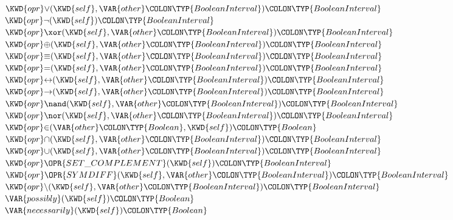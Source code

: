 \begin{Fortress}
\(  \KWD{opr} \mathord{\vee}(\KWD{self}, \VAR{other}\COLON \TYP{BooleanInterval})\COLON \TYP{BooleanInterval}\)\\
\(  \KWD{opr} \mathord{\neg}(\KWD{self})\COLON \TYP{BooleanInterval}\)\\
\(  \KWD{opr} \mathord{\xor}(\KWD{self}, \VAR{other}\COLON \TYP{BooleanInterval})\COLON \TYP{BooleanInterval}\)\\
\(  \KWD{opr} \mathord{\oplus}(\KWD{self}, \VAR{other}\COLON \TYP{BooleanInterval})\COLON \TYP{BooleanInterval}\)\\
\(  \KWD{opr} \mathord{\equiv}(\KWD{self}, \VAR{other}\COLON \TYP{BooleanInterval})\COLON \TYP{BooleanInterval}\)\\
\(  \KWD{opr} \mathord{=}(\KWD{self}, \VAR{other}\COLON \TYP{BooleanInterval})\COLON \TYP{BooleanInterval}\)\\
\(  \KWD{opr} \mathord{\leftrightarrow}(\KWD{self}, \VAR{other}\COLON \TYP{BooleanInterval})\COLON \TYP{BooleanInterval}\)\\
\(  \KWD{opr} \mathord{\rightarrow}(\KWD{self}, \VAR{other}\COLON \TYP{BooleanInterval})\COLON \TYP{BooleanInterval}\)\\
\(  \KWD{opr} \mathord{\nand}(\KWD{self}, \VAR{other}\COLON \TYP{BooleanInterval})\COLON \TYP{BooleanInterval}\)\\
\(  \KWD{opr} \mathord{\nor}(\KWD{self}, \VAR{other}\COLON \TYP{BooleanInterval})\COLON \TYP{BooleanInterval}\)\\
\(  \KWD{opr} \mathord{\in}(\VAR{other}\COLON \TYP{Boolean}, \KWD{self})\COLON \TYP{Boolean}\)\\
\(  \KWD{opr} \mathord{\cap}(\KWD{self}, \VAR{other}\COLON \TYP{BooleanInterval})\COLON \TYP{BooleanInterval}\)\\
\(  \KWD{opr} \mathord{\cup}(\KWD{self}, \VAR{other}\COLON \TYP{BooleanInterval})\COLON \TYP{BooleanInterval}\)\\
\(  \KWD{opr} \mathord{\OPR{SET\_COMPLEMENT}}(\KWD{self})\COLON \TYP{BooleanInterval}\)\\
\(  \KWD{opr} \mathord{\OPR{SYMDIFF}}(\KWD{self}, \VAR{other}\COLON \TYP{BooleanInterval})\COLON \TYP{BooleanInterval}\)\\
\(  \KWD{opr} \mathord{\setminus}(\KWD{self}, \VAR{other}\COLON \TYP{BooleanInterval})\COLON \TYP{BooleanInterval}\)\\
\(  \VAR{possibly}(\KWD{self})\COLON \TYP{Boolean}\)\\
\(  \VAR{necessarily}(\KWD{self})\COLON \TYP{Boolean}\)\\

\end{Fortress}
